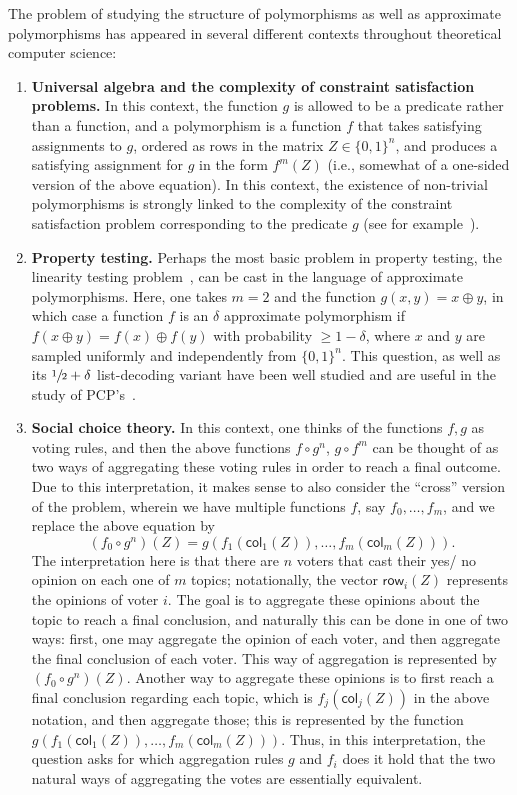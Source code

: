 \documentclass{article}
\theoremstyle{definition}
\theoremstyle{remark}
\providecommand{\row}{\mathsf{row}}
\providecommand{\col}{\mathsf{col}}
\providecommand{\half}{\sfrac12}
\renewcommand\geq{\geqslant}
\begin{document}
The problem of studying the structure of polymorphisms as well as approximate polymorphisms has appeared in several different contexts throughout theoretical computer science:
\begin{enumerate}
    \item 
    \textbf{Universal algebra and the complexity of constraint satisfaction problems.} In this context, the function $g$ is allowed to be a predicate rather than a function, and a polymorphism is a function $f$ that takes satisfying assignments to $g$, ordered as rows in the matrix $Z\in\{0,1\}^n$, and produces a satisfying assignment for $g$ in the form $f^{m}(Z)$ (i.e., somewhat of a one-sided version of the above equation). In this context, the existence of non-trivial polymorphisms is strongly linked 
    to the complexity of the constraint satisfaction problem corresponding to the 
    predicate $g$ (see for example~\cite{CSPpoly}).
    
    \item \textbf{Property testing.} Perhaps the most basic problem in property testing, the linearity testing problem~\cite{BLR,Bellare}, can be cast in the language of approximate polymorphisms. Here, one takes $m=2$ and the function $g(x,y) = x\oplus y$, in which case a function $f$ is an $\delta$ approximate polymorphism 
    if $f(x\oplus y) = f(x)\oplus f(y)$ with probability $\geq 1-\delta$, where 
    $x$ and $y$ are sampled uniformly and independently from $\{0,1\}^n$. This question, as well as its $\half + \delta$ list-decoding variant have been 
    well studied and are useful in the study of PCP's~\cite{Hastad}.
    
    \item \textbf{Social choice theory.} In this context, one thinks of the functions 
    $f,g$ as voting rules, and then the above functions $f\circ g^n$, 
    $g\circ f^m$ can be thought of as two ways of aggregating these 
    voting rules in order to reach a final outcome. %
    Due to this interpretation,
    it makes sense
    to also consider the ``cross'' version of the problem, wherein we have multiple functions $f$, say $f_0,\ldots,f_m$, and we replace the above equation by
    \[
    (f_0\circ g^{n})(Z) = g(f_1(\col_1(Z)),\ldots,f_m(\col_m(Z))).
    \]
    The interpretation here is that there are $n$ voters that cast their yes/ no opinion on each one of $m$ topics; notationally, the vector 
    $\row_i(Z)$ represents the opinions of voter $i$. The goal is to aggregate
    these opinions about the topic to reach a final conclusion, and naturally
    this can be done in one of two ways: first, one may aggregate the opinion 
    of each voter, and then aggregate the final conclusion of each voter. This
    way of aggregation is represented by $(f_0\circ g^{n})(Z)$. Another way
    to aggregate these opinions is to first reach a final conclusion regarding
    each topic, which is $f_j(\col_j(Z))$ in the above notation, and then aggregate those; this is represented by the function $g(f_1(\col_1(Z)),\ldots,f_m(\col_m(Z)))$. Thus, in this interpretation, the 
    question asks for which aggregation rules $g$ and $f_i$ does it hold that 
    the two natural ways of aggregating the votes are essentially equivalent.
    

\end{enumerate}
\end{document}
